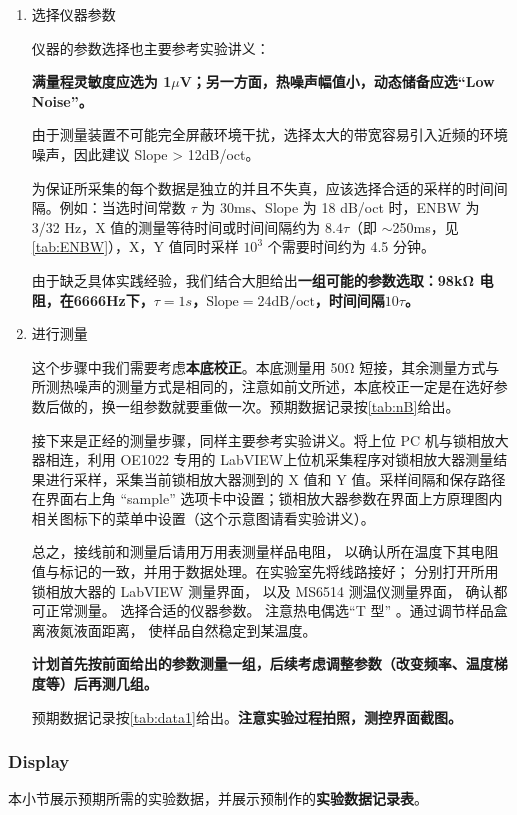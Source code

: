 \begin{enumerate}
	仪器校正方面，此步骤中我们主要考虑\textbf{零点校正}。
	
	\item 选择仪器参数
	
	仪器的参数选择也主要参考实验讲义：
	
	\textbf{满量程灵敏度应选为 1$\mu$V；另一方面，热噪声幅值小，动态储备应选“Low Noise”。}
	
	由于测量装置不可能完全屏蔽环境干扰，选择太大的带宽容易引入近频的环境噪声，因此建议 Slope > 12dB/oct。
	
	为保证所采集的每个数据是独立的并且不失真，应该选择合适的采样的时间间隔。例如：当选时间常数 $\tau$ 为 30ms、Slope 为 18 dB/oct 时，ENBW 为 3/32 Hz，X 值的测量等待时间或时间间隔约为 $8.4\tau$（即 $\sim$250ms，见\cref{tab:ENBW}），X，Y 值同时采样 $10^3$ 个需要时间约为 4.5 分钟。
	
	由于缺乏具体实践经验，我们结合\cite{c}大胆给出\textbf{一组可能的参数选取：98kΩ 电阻，在6666Hz下，$\tau=1s$，$\text{Slope}=24\text{dB/oct}$，时间间隔$10\tau$。}
	
	\item 进行测量
	
	这个步骤中我们需要考虑\textbf{本底校正}。本底测量用 50Ω 短接，其余测量方式与所测热噪声的测量方式是相同的，注意如前文所述，本底校正一定是在选好参数后做的，换一组参数就要重做一次。预期数据记录按\cref{tab:nB}给出。
	
	接下来是正经的测量步骤，同样主要参考实验讲义。将上位 PC 机与锁相放大器相连，利用 OE1022 专用的 LabVIEW上位机采集程序对锁相放大器测量结果进行采样，采集当前锁相放大器测到的 X 值和 Y 值。采样间隔和保存路径在界面右上角 “sample” 选项卡中设置；锁相放大器参数在界面上方原理图内相关图标下的菜单中设置（这个示意图请看实验讲义）。
	
	总之，接线前和测量后请用万用表测量样品电阻， 以确认所在温度下其电阻值与标记的一致，并用于数据处理。在实验室先将线路接好； 分别打开所用锁相放大器的 LabVIEW 测量界面， 以及 MS6514 测温仪测量界面， 确认都可正常测量。 选择合适的仪器参数。 注意热电偶选“T 型” 。通过调节样品盒离液氮液面距离， 使样品自然稳定到某温度。
	
	\textbf{计划首先按前面给出的参数测量一组，后续考虑调整参数（改变频率、温度梯度等）后再测几组。}
	
	预期数据记录按\cref{tab:data1}给出。\textbf{注意实验过程拍照，测控界面截图。}
	
\end{enumerate}	

\subsubsection{Display}
本小节展示预期所需的实验数据，并展示预制作的\textbf{实验数据记录表}。

